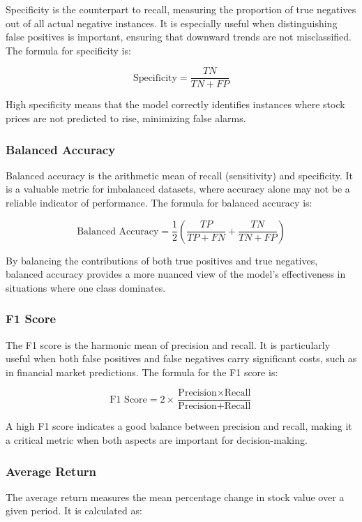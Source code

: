 \documentclass[aodsor,preprint]{imsart}
\numberwithin{equation}{section}
\theoremstyle{plain}
\begin{document}
Specificity is the counterpart to recall, measuring the proportion of true negatives out of all actual negative instances. It is especially useful when distinguishing false positives is important, ensuring that downward trends are not misclassified. The formula for specificity is:

\[
\text{Specificity} = \frac{TN}{TN + FP}
\]

High specificity means that the model correctly identifies instances where stock prices are not predicted to rise, minimizing false alarms.

\subsubsection{Balanced Accuracy}

Balanced accuracy is the arithmetic mean of recall (sensitivity) and specificity. It is a valuable metric for imbalanced datasets, where accuracy alone may not be a reliable indicator of performance. The formula for balanced accuracy is:

\[
\text{Balanced Accuracy} = \frac{1}{2} \left( \frac{TP}{TP + FN} + \frac{TN}{TN + FP} \right)
\]

By balancing the contributions of both true positives and true negatives, balanced accuracy provides a more nuanced view of the model’s effectiveness in situations where one class dominates.

\subsubsection{F1 Score}

The F1 score is the harmonic mean of precision and recall. It is particularly useful when both false positives and false negatives carry significant costs, such as in financial market predictions. The formula for the F1 score is:

\[
\text{F1 Score} = 2 \times \frac{\text{Precision} \times \text{Recall}}{\text{Precision} + \text{Recall}}
\]

A high F1 score indicates a good balance between precision and recall, making it a critical metric when both aspects are important for decision-making.

\subsubsection{Average Return}

The average return measures the mean percentage change in stock value over a given period. It is calculated as:
\end{document}
